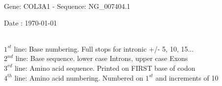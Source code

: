 \documentclass{article}
\begin{document}
\renewcommand{\footrulewidth}{1pt}
\renewcommand{\headrulewidth}{0pt}
\begin{center}
\begin{large}
 Gene: COL3A1 - Sequence: NG\_007404.1
 
 Date : \today\\\\
\end{large}
\end{center}
$1^{st}$ line: Base numbering. Full stops for intronic +/- 5, 10, 15...\\
$2^{nd}$ line: Base sequence. lower case Introns, upper case Exons\\
$3^{rd}$ line: Amino acid sequence. Printed on FIRST base of codon\\
$4^{th}$ line: Amino acid numbering. Numbered on $1^{st}$ and increments of 10\\
\end{document}
